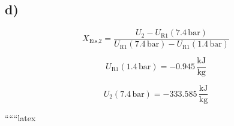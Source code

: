 

\subsection*{d)}

\[
X_{\text{Eis,2}} = \frac{U_2 - U_{\text{R1}}(7.4 \, \text{bar})}{U_{\text{R1}}(7.4 \, \text{bar}) - U_{\text{R1}}(1.4 \, \text{bar})}
\]

\[
U_{\text{R1}}(1.4 \, \text{bar}) = -0.945 \, \frac{\text{kJ}}{\text{kg}}
\]

\[
U_2 (7.4 \, \text{bar}) = -333.585 \, \frac{\text{kJ}}{\text{kg}}
\]

``````latex